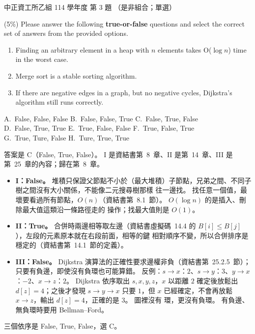 \begin{pastexam}[label={px:ccu-114-csb-03}]{中正資工所乙組 114 學年度 第 3 題}
（是非組合；單選）

(5\%) Please answer the following \textbf{true-or-false} questions and select the correct set of answers from the provided options.
\begin{enumerate}[label=\Roman*.]
\item Finding an arbitrary element in a heap with $n$ elements takes O($\log n$) time in the worst case.
\item Merge sort is a stable sorting algorithm.
\item If there are negative edges in a graph, but no negative cycles, Dijkstra's algorithm still runs correctly.
\end{enumerate}

A.~False, False, False \qquad B.~False, False, True \qquad C.~False, True, False\\
D.~False, True, True \qquad E.~True, False, False \qquad F.~True, False, True\\
G.~True, Ture, False \qquad H.~Ture, True, True
\end{pastexam}

\begin{pastsoln}
答案是 C（False, True, False）。 I 是資結書第~8~章、II 是第~14~章、III 是第~25~章的內容；歸在第~8~章。

\begin{itemize}
\item \textbf{I：False。} 堆積只保證父節點不小於（最大堆積）子節點，兄弟之間、不同子樹之間沒有大小關係，不能像二元搜尋樹那樣
往一邊找。 找任意一個值，最壞要看過所有節點，$O(n)$（資結書第~8.1~節）。 $O(\log n)$ 的是插入、刪除最大值這類沿一條路徑走的
操作；找最大值則是 $O(1)$。
\item \textbf{II：True。} 合併時兩邊相等取左邊（資結書虛擬碼~14.4 的 $B[i] \le B[j]$），左段的元素原本就在右段前面，相等的鍵
相對順序不變，所以合併排序是穩定的（資結書第~14.1~節的定義）。
\item \textbf{III：False。} Dijkstra 演算法的正確性要求邊權非負（資結書第~25.2.5~節）；只要有負邊，即使沒有負環也可能算錯。
反例：$s \to x$：$2$、$s \to y$：$3$、$y \to x$：$-2$、$x \to z$：$2$。 Dijkstra 依序取出 $s, x, y, z$，$x$ 以距離 $2$ 確定後放鬆出
$d[z] = 4$；之後才發現 $s \to y \to x$ 只要 $1$，但 $x$ 已經確定，不會再放鬆 $x \to z$，輸出 $d[z] = 4$，正確的是 $3$。 圖裡沒有
環，更沒有負環。 有負邊、無負環時要用 Bellman--Ford。
\end{itemize}
三個依序是 False, True, False，選 C。
\end{pastsoln}

